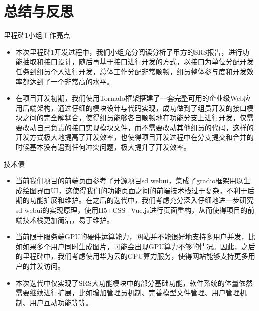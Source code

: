 %
%
%
%
\section{总结与反思}
\begin{frame}{里程碑1小组工作亮点}
    \begin{itemize}
        \item 本次里程碑1开发过程中，我们小组充分阅读分析了甲方的SRS报告，进行功能抽取和接口设计，随后再基于接口进行开发的方式，以接口为单位分配开发任务到组员个人进行开发，总体工作分配非常顺畅，组员整体参与度和开发效率都达到了一个非常高的水平。
        \item 在项目开发初期，我们使用Tornado框架搭建了一套完整可用的企业级Web应用后端架构，通过仔细的模块设计与代码实现，成功做到了组员开发的接口模块之间的完全解耦合，使得组员能够各自顺畅地在功能分支上进行开发，仅需要改动自己负责的接口实现模块文件，而不需要改动其他组员的代码，这样的开发方式极大地提高了开发效率，也使得项目开发过程中在分支提交和合并的时候基本没有遇到任何冲突问题，极大提升了开发效率。
    \end{itemize}
\end{frame}

\begin{frame}{技术债}
    \begin{itemize}
        \item 当前我们项目的前端页面参考了开源项目sd webui，集成了gradio框架用以生成绘图界面UI，这使得我们的功能页面之间的前端技术栈过于复杂，不利于后期的功能扩展和维护。在之后的迭代中，我们考虑充分深入仔细地进一步研究sd webui的实现原理，使用H5+CSS+Vue.js进行页面重构，从而使得项目的前端技术栈更加简洁，易于维护。
        \item 当前限于服务端GPU的硬件运算能力，网站并不能很好地支持多用户并发，比如如果多个用户同时生成图片，可能会出现GPU算力不够的情况。因此，之后的里程碑中，我们考虑使用华为云的GPU算力服务，使得网站能够支持更多用户的并发访问。
        \item 本次迭代中仅实现了SRS大功能模块中的部分基础功能，软件系统的体量依然需要继续进行扩展，比如增加管理员机制、完善模型文件管理、用户管理机制、用户互动功能等等。
    \end{itemize}
\end{frame}

